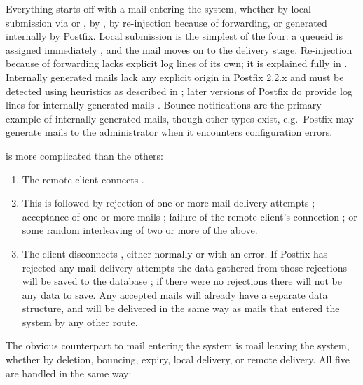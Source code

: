 Everything starts off with a mail entering the system, whether by local
submission via  or , by ,
by re-injection because of forwarding, or generated internally by Postfix.
Local submission is the simplest of the four: a queueid is assigned
immediately , and the mail moves on to the delivery
stage.  Re-injection because of forwarding lacks explicit log lines of its
own; it is explained fully in .  Internally
generated mails lack any explicit origin in Postfix 2.2.x and must be
detected using heuristics as described in ; later versions of Postfix do provide log lines for
internally generated mails .  Bounce
notifications are the primary example of internally generated mails, though
other types exist, e.g.\ Postfix may generate mails to the administrator
when it encounters configuration errors.

 is more complicated than the others:

\begin{enumerate}

    \item The remote client connects .

    \item This is followed by rejection of one or more mail delivery
        attempts ; acceptance of one or
        more mails ; failure of the remote client's
        connection ; or some random
        interleaving of two or more of the above.

    \item The client disconnects , either normally or with an error.  If Postfix has
        rejected any mail delivery attempts the data gathered from those
        rejections will be saved to the database ;
        if there were no rejections there will not be any data to save.
        Any accepted mails will already have a separate data structure, and
        will be delivered in the same way as mails that entered the system
        by any other route.

\end{enumerate}

The obvious counterpart to mail entering the system is mail leaving the
system, whether by deletion, bouncing, expiry, local delivery, or remote
delivery.  All five are handled in the same way:

